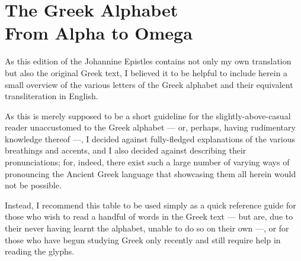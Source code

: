 \chapter*{The Greek Alphabet \\ \large From Alpha to Omega}
  
As this edition of the Johannine Epistles contains not only my own translation but also the original Greek text, I believed it to be helpful to include herein a small overview of the various letters of the Greek alphabet and their equivalent transliteration in English. 

As this is merely supposed to be a short guideline for the slightly-above-casual reader unaccustomed to the Greek alphabet — or, perhaps, having rudimentary knowledge thereof —, I decided against fully-fledged explanations of the various breathings and accents, and I also decided against describing their pronunciations; for, indeed, there exist such a large number of varying ways of pronouncing the Ancient Greek language that showcasing them all herein would not be possible. 

Instead, I recommend this table to be used simply as a quick reference guide for those who wish to read a handful of words in the Greek text — but are, due to their never having learnt the alphabet, unable to do so on their own —, or for those who have begun studying Greek only recently and still require help in reading the glyphs. 
  
